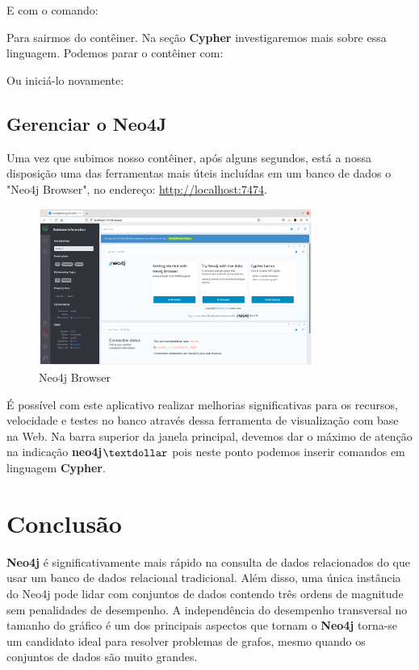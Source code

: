 \documentclass[a4paper,11pt]{article}
\begin{document}
E com o comando: \\

Para sairmos do contêiner. Na seção \textbf{Cypher} investigaremos mais sobre essa linguagem. Podemos parar o contêiner com: \\

Ou iniciá-lo novamente: \\

\subsection{Gerenciar o Neo4J}
Uma vez que subimos nosso contêiner, após alguns segundos, está a nossa disposição uma das ferramentas mais úteis incluídas em um banco de dados o "Neo4j Browser", no endereço: \url{http://localhost:7474}.
\begin{figure}[H]
	\centering
	\includegraphics[width=0.8\textwidth]{imagens/browser}
	\caption{Neo4j Browser}
\end{figure}

É possível com este aplicativo realizar melhorias significativas para os recursos, velocidade e testes no banco através dessa ferramenta de visualização com base na Web. Na barra superior da janela principal, devemos dar o máximo de atenção na indicação \textbf{neo4j$\textdollar$ }pois neste ponto podemos inserir comandos em linguagem \textbf{Cypher}.



% 

\section{Conclusão}
\textbf{Neo4j} é significativamente mais rápido na consulta de dados relacionados do que usar um banco de dados relacional tradicional. Além disso, uma única instância do Neo4j pode lidar com conjuntos de dados contendo três ordens de magnitude sem penalidades de desempenho. A independência do desempenho transversal no tamanho do gráfico é um dos principais aspectos que tornam o \textbf{Neo4j} torna-se um candidato ideal para resolver problemas de grafos, mesmo quando os conjuntos de dados são muito grandes.
\end{document}
